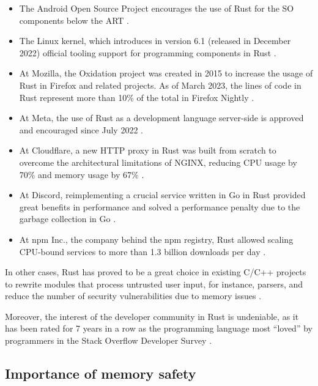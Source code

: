 \begin{itemize}
      \item The Android Open Source Project encourages
            the use of Rust for the SO components
            below the \acrfull{ART} \cite{stoep2021}.
      \item The Linux kernel, which introduces in version 6.1
            (released in December 2022) official tooling
            support for programming components in Rust
            \cite{corbet2022,desimone2022}.
      \item At Mozilla, the Oxidation project was created in 2015
            to increase the usage of Rust in Firefox and related projects.
            As of March 2023, the lines of code in Rust represent more than
            10\% of the total in Firefox Nightly \cite{mozilla-oxidation}.
      \item At Meta, the use of Rust as a development language server-side
            is approved and encouraged since July 2022 \cite{garcia2022}.
      \item At Cloudflare, a new HTTP proxy in Rust was built from scratch
            to overcome the architectural limitations of NGINX,
            reducing CPU usage by 70\% and memory usage by 67\% \cite{wu2022}.
      \item At Discord, reimplementing a crucial service written in Go
            in Rust provided great benefits in performance
            and solved a performance penalty due to the garbage collection in Go \cite{howarth2020}.
      \item At npm Inc., the company behind the npm registry, Rust allowed scaling CPU-bound services
            to more than 1.3 billion downloads per day \cite{rust-npm-case-study}.
\end{itemize}

In other cases, Rust has proved to be a great choice in existing C/C++ projects to rewrite modules
that process untrusted user input, for instance, parsers,
and reduce the number of security vulnerabilities due to memory issues \cite{chifflier2017writing}.

Moreover, the interest of the developer community in Rust is undeniable,
as it has been rated for 7 years in a row as the programming language most ``loved'' by programmers
in the Stack Overflow Developer Survey \cite{so-survey2022}.

\subsection{Importance of memory safety}

